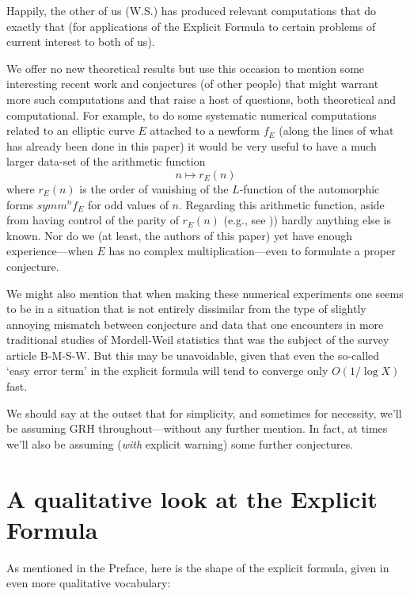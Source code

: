 \documentclass[11pt]{article}
\theoremstyle{plain}
\theoremstyle{definition}
\numberwithin{equation}{section}
\numberwithin{figure}{section}
\numberwithin{table}{section}
\begin{document}
 Happily, the other of us (W.S.) has produced relevant computations that do exactly that (for applications of the Explicit Formula to certain problems of current interest to both of us).%

 We offer no new theoretical results but use this occasion to mention some interesting recent work and conjectures  (of other people)  that might warrant more such computations and that raise a host of questions, both theoretical and computational.   For example, to do some systematic numerical computations related to an elliptic curve $E$ attached to a newform $f_E$  (along the lines of what has already been done in this paper)  it would be very useful to have a much larger data-set  of the arithmetic function  $$n \mapsto r_E(n)$$
 where $r_E(n)$ is the order of vanishing of the $L$-function of the automorphic forms $symm^nf_E$ for odd values of $n$.  Regarding this arithmetic function, aside from having control of the parity of   $r_E(n)$  (e.g., see \cite{DMW}))  hardly anything else is known. Nor do we (at least, the authors of this paper)  yet have enough experience---when $E$ has no complex multiplication---even to formulate a proper conjecture.

 We might also mention that when making these numerical experiments one seems to be in a situation  that is not entirely dissimilar from the type of slightly annoying mismatch between conjecture and data that one encounters in more traditional studies of Mordell-Weil statistics  that was the subject of the survey article B-M-S-W.  But this may be unavoidable, given that even  the so-called  `easy error term' in the explicit formula will tend to converge  only $O(1/\log X)$ fast.

 We should say at the outset that for simplicity, and sometimes for necessity, we'll be assuming GRH throughout---without any further mention. In fact, at times we'll also be assuming ({\it with} explicit warning) some further conjectures.


 \section{A qualitative look at the Explicit Formula}
 As mentioned in the Preface, here is the shape of the explicit formula, given in even more qualitative vocabulary:
\end{document}
